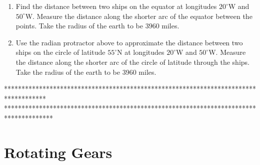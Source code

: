 \documentclass{ximera}
\begin{document}
\begin{question} \label{Q35yt6344bnxx}
\begin{enumerate}
\item Find the distance between two ships on the equator at longitudes $20^\circ$W and $50^\circ$W. Measure the distance along the shorter arc of the equator between the points. Take the radius of the earth to be $3960$ miles.

\item Use the radian protractor above to approximate the distance between two ships on the circle of latitude $55^\circ$N at longitudes $20^\circ$W and $50^\circ$W. Measure the distance along the shorter arc of the circle of latitude through the ships.  Take the radius of the earth to be $3960$ miles.
\end{enumerate}

 
\begin{onlineOnly}
    \begin{center}
\end{center}
\end{onlineOnly}


\end{question}




\iffalse
************************************************************************************
**************************************************************************************



\section{Rotating Gears}
\end{document}
